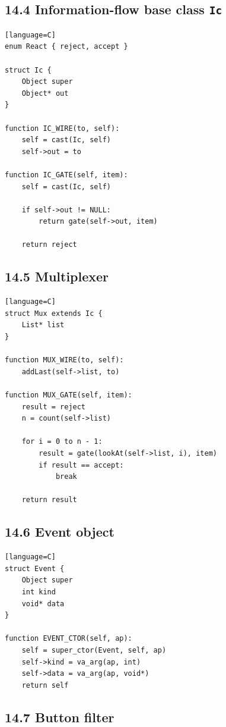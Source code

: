 \documentclass[11pt]{article}
\begin{document}
\subsection{\texorpdfstring{14.4 Information-flow base class
\texttt{Ic}}{14.4 Information-flow base class Ic}}\label{information-flow-base-class-ic}

\begin{verbatim}[language=C]
enum React { reject, accept }

struct Ic {
    Object super
    Object* out
}

function IC_WIRE(to, self):
    self = cast(Ic, self)
    self->out = to

function IC_GATE(self, item):
    self = cast(Ic, self)

    if self->out != NULL:
        return gate(self->out, item)

    return reject
\end{verbatim}

\subsection{14.5 Multiplexer}\label{multiplexer}

\begin{verbatim}[language=C]
struct Mux extends Ic {
    List* list
}

function MUX_WIRE(to, self):
    addLast(self->list, to)

function MUX_GATE(self, item):
    result = reject
    n = count(self->list)

    for i = 0 to n - 1:
        result = gate(lookAt(self->list, i), item)
        if result == accept:
            break

    return result
\end{verbatim}

\subsection{14.6 Event object}\label{event-object}

\begin{verbatim}[language=C]
struct Event {
    Object super
    int kind
    void* data
}

function EVENT_CTOR(self, ap):
    self = super_ctor(Event, self, ap)
    self->kind = va_arg(ap, int)
    self->data = va_arg(ap, void*)
    return self
\end{verbatim}

\subsection{14.7 Button filter}\label{button-filter}
\end{document}
